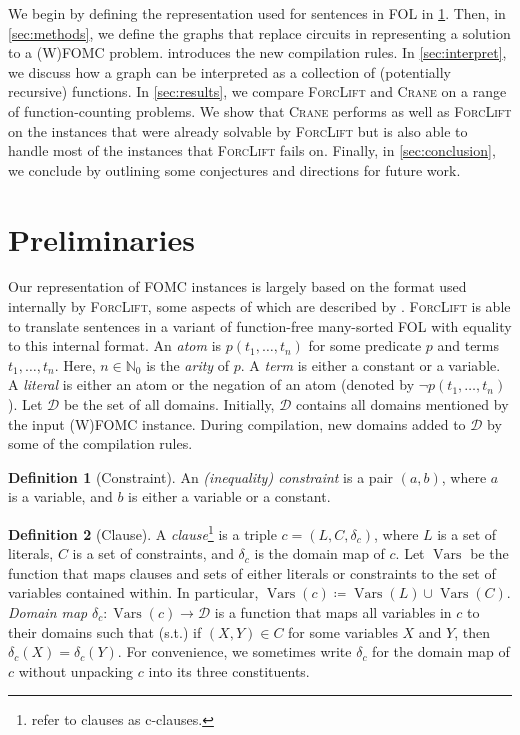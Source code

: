 \documentclass[letterpaper]{article} %
\DeclareMathOperator{\Vars}{Vars}
\theoremstyle{definition}
\newtheorem{definition}{Definition}
\begin{document}
We begin by defining the representation used for sentences in FOL in
\cref{sec:recprelims}. Then, in \cref{sec:methods}, we define the graphs that
replace circuits in representing a solution to a (W)FOMC problem.
 introduces the new compilation rules. In \cref{sec:interpret},
we discuss how a graph can be interpreted as a collection of (potentially
recursive) functions. In \cref{sec:results}, we compare \textsc{ForcLift} and
\textsc{Crane} on a range of function-counting problems. We show that
\textsc{Crane} performs as well as \textsc{ForcLift} on the instances that were
already solvable by \textsc{ForcLift} but is also able to handle most of the
instances that \textsc{ForcLift} fails on. Finally, in \cref{sec:conclusion}, we
conclude by outlining some conjectures and directions for future work.

\section{Preliminaries}\label{sec:recprelims}

Our representation of FOMC instances is largely based on the format used
internally by \textsc{ForcLift}, some aspects of which are described by
\citet{DBLP:conf/ijcai/BroeckTMDR11}. \textsc{ForcLift} is able to translate
sentences in a variant of function-free many-sorted FOL with equality to this
internal format. An \emph{atom} is $p(t_1, \dots, t_n)$ for some predicate $p$
and terms $t_{1}, \dots, t_{n}$. Here, $n \in \mathbb{N}_0$ is the \emph{arity}
of $p$. A \emph{term} is either a constant or a variable. A \emph{literal} is
either an atom or the negation of an atom (denoted by
$\neg p(t_1, \dots, t_n)$). Let $\mathcal{D}$ be the set of all domains.
Initially, $\mathcal{D}$ contains all domains mentioned by the input (W)FOMC
instance. During compilation, new domains added to $\mathcal{D}$ by some of the
compilation rules.

\begin{definition}[Constraint]\label{def:constraint}
  An \emph{(inequality) constraint} is a pair $(a, b)$, where $a$ is a variable,
  and $b$ is either a variable or a constant.
\end{definition}

\begin{definition}[Clause]\label{def:clause}
  A \emph{clause}\footnote{\citet{DBLP:conf/ijcai/BroeckTMDR11} refer to clauses
    as c-clauses.} is a triple $c = (L, C, \delta_c)$, where $L$ is a set of
  literals, $C$ is a set of constraints, and $\delta_c$ is the domain map of
  $c$. Let $\Vars$ be the function that maps clauses and sets of either literals
  or constraints to the set of variables contained within. In particular,
  $\Vars(c) \coloneqq \Vars(L) \cup \Vars(C)$. \emph{Domain map}
  $\delta_{c}\colon \Vars(c) \to \mathcal{D}$ is a function that maps all
  variables in $c$ to their domains such that (s.t.) if $(X, Y) \in C$ for some
  variables $X$ and $Y$, then $\delta_c(X) = \delta_c(Y)$. For convenience, we
  sometimes write $\delta_c$ for the domain map of $c$ without unpacking $c$
  into its three constituents.
\end{definition}
\end{document}
